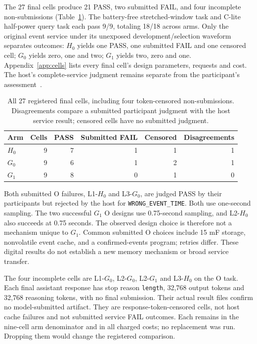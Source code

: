 The 27 final cells produce 21 PASS, two submitted FAIL, and four incomplete
non-submissions (Table~\ref{tab:outcomes}). The battery-free stretched-window
task and C-lite half-power query task each pass 9/9, totaling 18/18 across
arms. Only the original event service under its unexposed development/selection
waveform separates outcomes: $H_0$ yields one PASS, one submitted FAIL and one
censored cell; $G_0$ yields zero, one and two; $G_1$ yields two, zero and one.
Appendix~\ref{app:cells} lists every final cell's design parameters, requests
and cost. The host's complete-service judgment remains separate from the
participant's assessment~\cite{results}.

\begin{table}[htbp]
\centering
\footnotesize
\begin{tabular}{lrrrrr}
\toprule
Arm & Cells & PASS & Submitted FAIL & Censored & Disagreements \\
\midrule
$H_0$ & 9 & 7 & 1 & 1 & 1 \\
$G_0$ & 9 & 6 & 1 & 2 & 1 \\
$G_1$ & 9 & 8 & 0 & 1 & 0 \\
\bottomrule
\end{tabular}
\caption{All 27 registered final cells, including four token-censored non-submissions. Disagreements compare a submitted participant judgment with the host service result; censored cells have no submitted judgment.}
\label{tab:outcomes}
\end{table}

Both submitted O failures, L1-$H_0$ and L3-$G_0$, are judged PASS by their
participants but rejected by the host for \texttt{WRONG\_EVENT\_TIME}. Both
use one-second sampling. The two successful $G_1$ O designs use 0.75-second
sampling, and L2-$H_0$ also succeeds at 0.75 seconds. The observed design
choice is therefore not a mechanism unique to $G_1$. Common submitted O
choices include 15 mF storage, nonvolatile event cache, and a confirmed-events
program; retries differ. These digital results do not establish a new
memory mechanism or broad service transfer.

The four incomplete cells are L1-$G_0$, L2-$G_0$, L2-$G_1$ and L3-$H_0$ on
the O task. Each final assistant response has stop reason \texttt{length},
32,768 output tokens and 32,768 reasoning tokens, with no final submission.
Their actual result files confirm no model-submitted artifact. They are
response-token-censored cells, not host cache failures and not submitted
service FAIL outcomes. Each remains in the nine-cell arm denominator and in
all charged costs; no replacement was run. Dropping them would change the
registered comparison.

